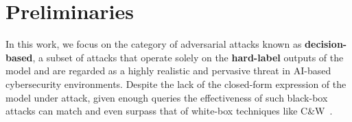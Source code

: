 


\section{Preliminaries}
\label{sec:background}
In this work, we focus on the category of adversarial attacks known as \textbf{decision-based}, a subset of  attacks that operate solely on the \textbf{hard-label} outputs of the model and are regarded as a highly realistic and pervasive threat in AI-based cybersecurity environments.
Despite the lack of the closed-form expression of the model under attack, given enough queries the effectiveness of such black-box attacks can match and even surpass that of white-box techniques like C\&W~\cite{carlini2017towards}.

